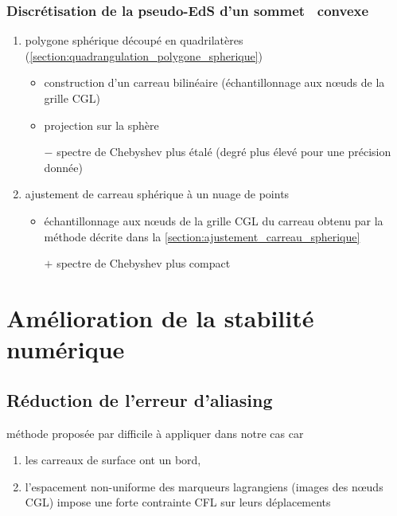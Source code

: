 \subsubsection{Discrétisation de la pseudo-EdS d'un sommet \brep\ convexe}
\begin{enumerate}
	\item polygone sphérique découpé en quadrilatères (\cf \autoref{section:quadrangulation_polygone_spherique})
	\begin{itemize}
		\item construction d'un carreau bilinéaire (échantillonnage aux n\oe uds de la grille CGL)
		\item projection sur la sphère
		\item[$-$] spectre de Chebyshev plus étalé (degré plus élevé pour une précision donnée)
	\end{itemize}
	\item ajustement de carreau sphérique à un nuage de points
	\begin{itemize}
		\item échantillonnage aux n\oe uds de la grille CGL du carreau obtenu par la méthode décrite dans la \autoref{section:ajustement_carreau_spherique}
		\item[$+$] spectre de Chebyshev plus compact
	\end{itemize}
\end{enumerate}




\section{Amélioration de la stabilité numérique}
\label{section:instabilités}

\subsection{Réduction de l'erreur d'aliasing}

méthode proposée par \cite{rahimian2015} difficile à appliquer dans notre cas car 
\begin{enumerate}
	\item les carreaux de surface ont un bord, 
	\item l'espacement non-uniforme des marqueurs lagrangiens (images des n\oe uds CGL) impose une forte contrainte CFL sur leurs déplacements
\end{enumerate}

